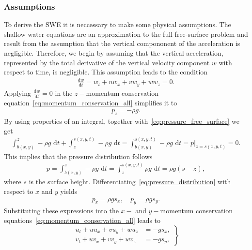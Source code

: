 \subsubsection*{Assumptions}
To derive the SWE it is neccessary to make some physical assumptions. 
The shallow water equations are an approximation to the full free-surface problem and result from the assumption that the vertical compononent of the acceleration is negligible.
Therefore, we begin by assuming that the vertical acceleration, represented by the total derivative of the vertical velocity component $w$ with respect to time, is negligible.
This assumption leads to the condition
\begin{align*}
    \frac{\text{d} w}{\text{d} t} = w_t + uw_x + vw_y + ww_z = 0.
\end{align*}
Applying $\frac{\text{d}w}{\text{d}t} = 0$ in the $z-$momentum conservation equation~\eqref{eq:momentum_conservation_all} simplifies it to
\begin{align*}
    p_z = -\rho g.
\end{align*}
By using properties of an integral, together with~\eqref{eq:pressure_free_surface} we get
\begin{align*}
    \int_{b(x,y)}^z - \rho g \text{ d}t + \int_z^{s(x,y,t)} - \rho g \text{ d}t = \int_{b(x,y)}^{s(x,y,t)} - \rho g \text{ d}t
    = p|_{z = s(x,y,t)} = 0.
\end{align*}
This implies that the pressure distribution follows
\begin{align}\label{eq:pressure_distribution}
    p = \int_{b(x,y)}^z - \rho g \text{ d}t = \int_z^{s(x,y,t)} \rho g \text{ d}t = \rho g (s - z),
\end{align}
where $s$ is the surface height.
Differentiating~\eqref{eq:pressure_distribution} with respect to $x$ and $y$ yields
\begin{align*}%
    p_x = \rho g s_x, \quad p_y = \rho g s_y.
\end{align*}
Substituting these expressions into the $x-$ and $y-$momentum conservation equations~\eqref{eq:momentum_conservation_all} leads to 
\begin{equation}\label{eq:momentum_conservation_xy_simplified}
    \left.
    \begin{aligned}
        u_t + u u_x + v u_y + w u_z &= -g s_x,  \\
        v_t + u v_x + v v_y + w v_z &= -g s_y,
    \end{aligned}
    \right\}
\end{equation}
